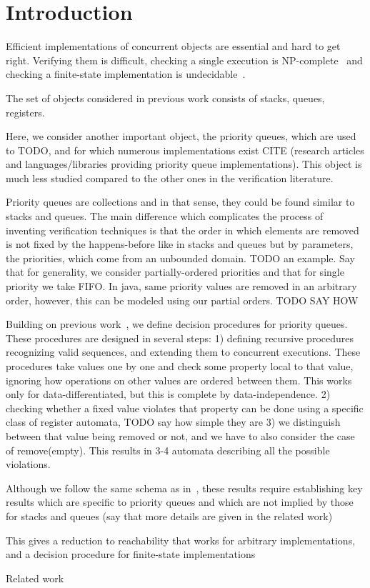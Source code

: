 \section{Introduction}
\label{sec:introduction}

Efficient implementations of concurrent objects are essential and hard to get right. Verifying them is difficult, checking a single execution is NP-complete~\cite{journals/siamcomp/GibbonsK97} and checking a finite-state implementation is undecidable~\cite{conf/esop/BouajjaniEEH13}.

The set of objects considered in previous work consists of stacks, queues, registers.

Here, we consider another important object, the priority queues, which are used to TODO, and for which numerous implementations exist CITE (research articles and languages/libraries providing priority queue implementations). This object is much less studied compared to the other ones in the verification literature.

Priority queues are collections and in that sense, they could be found similar to stacks and queues. The main difference which complicates the process of inventing verification techniques is that the order in which elements are removed is not fixed by the happens-before like in stacks and queues but by parameters, the priorities, which come from an unbounded domain. TODO an example. Say that for generality, we consider partially-ordered priorities and that for single priority we take FIFO. In java, same priority values are removed in an arbitrary order, however, this can be modeled using our partial orders. TODO SAY HOW

Building on previous work~\cite{DBLP:conf/icalp/BouajjaniEEH15}, we define decision procedures for priority queues. These procedures are designed in several steps:
1) defining recursive procedures recognizing valid sequences, and extending them to concurrent executions. These procedures take values one by one and check some property local to that value, ignoring how operations on other values are ordered between them. This works only for data-differentiated, but this is complete by data-independence.
2) checking whether a fixed value violates that property can be done using a specific class of register automata, TODO say how simple they are
3) we distinguish between that value being removed or not, and we have to also consider the case of remove(empty). This results in 3-4 automata describing all the possible violations.

Although we follow the same schema as in~\cite{DBLP:conf/icalp/BouajjaniEEH15}, these results require establishing key results which are specific to priority queues and which are not implied by those for stacks and queues (say that more details are given in the related work)

This gives a reduction to reachability that works for arbitrary implementations, and a decision procedure for finite-state implementations




\smallskip

\noindent Related work



